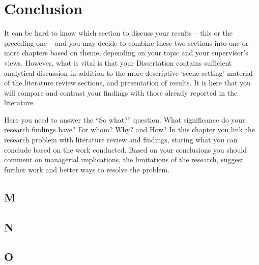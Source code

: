 \chapter{Conclusion}\label{ch:conclusion}

It can be hard to know which section to discuss your results – this or the preceding one – and you may decide to combine
these two sections into one or more chapters based on theme, depending on your topic and your supervisor’s views.
However, what is vital is that your Dissertation contains sufficient analytical discussion in addition to the more descriptive ‘scene setting’
material of the literature review sections, and presentation of results.
It is here that you will compare and contrast your findings with those already reported in the literature.

Here you need to answer the “So what?” question.
What significance do your research findings have?
For whom?
Why?
and How?
In this chapter you link the research problem with literature review and findings, stating what you can conclude based on the work conducted.
Based on your conclusions you should comment on managerial implications, the limitations of the research, suggest further work and better ways to resolve the problem.

\section{M}\label{sec:M}
\lipsum[1-5]

\section{N}\label{sec:N}
\lipsum[1-5]

\section{O}\label{sec:O}
\lipsum[1-5]